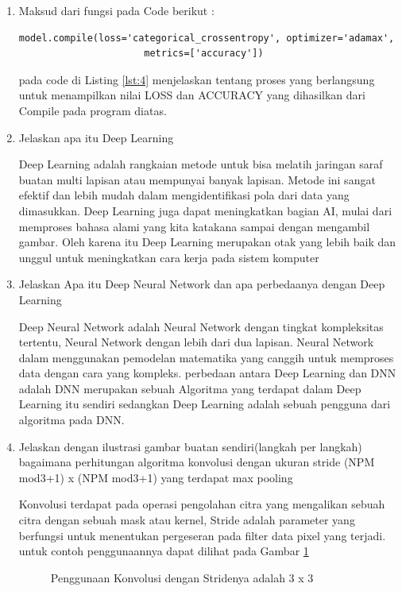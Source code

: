 \begin{enumerate}
\item Maksud dari fungsi pada Code berikut :
\begin{lstlisting}[caption=Compile model,label={lst:4}]
	model.compile(loss='categorical_crossentropy', optimizer='adamax',
	                  metrics=['accuracy'])
\end{lstlisting}
\par pada code di Listing \ref{lst:4} menjelaskan tentang proses yang berlangsung untuk menampilkan nilai LOSS dan ACCURACY yang dihasilkan dari Compile pada program diatas.

\item Jelaskan apa itu Deep Learning
\par Deep Learning adalah rangkaian metode untuk bisa melatih jaringan saraf buatan multi lapisan atau mempunyai banyak lapisan. Metode ini sangat efektif dan lebih mudah dalam mengidentifikasi pola dari data yang dimasukkan. Deep Learning juga dapat meningkatkan bagian AI, mulai dari memproses bahasa alami yang kita katakana sampai dengan mengambil gambar. Oleh karena itu Deep Learning merupakan otak yang lebih baik dan unggul untuk meningkatkan cara kerja pada sistem komputer

\item Jelaskan Apa itu Deep Neural Network dan apa perbedaanya dengan Deep Learning
\par Deep Neural Network adalah Neural Network dengan tingkat kompleksitas tertentu, Neural Network dengan lebih dari dua lapisan.  Neural Network dalam menggunakan pemodelan matematika yang canggih untuk memproses data dengan cara yang kompleks. perbedaan antara Deep Learning dan DNN adalah DNN merupakan sebuah Algoritma yang terdapat dalam Deep Learning itu sendiri sedangkan Deep Learning adalah sebuah pengguna dari algoritma pada DNN.

\item Jelaskan dengan ilustrasi gambar buatan sendiri(langkah per langkah) bagaimana perhitungan algoritma konvolusi dengan ukuran stride (NPM mod3+1) x (NPM mod3+1) yang terdapat max pooling

\par Konvolusi terdapat pada operasi pengolahan citra yang mengalikan sebuah citra dengan sebuah mask atau kernel, Stride adalah parameter yang berfungsi untuk menentukan pergeseran pada filter data pixel yang terjadi. untuk contoh penggunaannya dapat dilihat pada Gambar \ref{refer11}

\begin{figure}[!htbp]
      \caption{Penggunaan Konvolusi dengan Stridenya adalah 3 x 3}
      \label{refer11}
\end{figure}

\end{enumerate}


